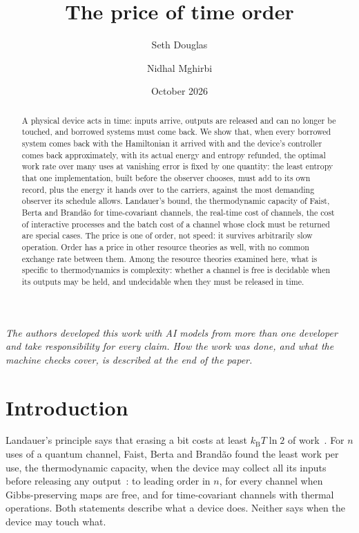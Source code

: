 \documentclass[11pt]{article}
\title{The price of time order}
\author{Seth Douglas \and Nidhal Mghirbi}
\date{October 2026}
\theoremstyle{definition}
\theoremstyle{remark}
\newcommand{\kB}{k_{\mathrm B}}
\begin{document}
\maketitle

\begin{abstract}
A physical device acts in time: inputs arrive, outputs are released and can no longer be touched, and borrowed systems must come back. We show that, when every borrowed system comes back with the Hamiltonian it arrived with and the device's controller comes back approximately, with its actual energy and entropy refunded, the optimal work rate over many uses at vanishing error is fixed by one quantity: the least entropy that one implementation, built before the observer chooses, must add to its own record, plus the energy it hands over to the carriers, against the most demanding observer its schedule allows. Landauer's bound, the thermodynamic capacity of Faist, Berta and Brand\~ao for time-covariant channels, the real-time cost of channels, the cost of interactive processes and the batch cost of a channel whose clock must be returned are special cases. The price is one of order, not speed: it survives arbitrarily slow operation. Order has a price in other resource theories as well, with no common exchange rate between them. Among the resource theories examined here, what is specific to thermodynamics is complexity: whether a channel is free is decidable when its outputs may be held, and undecidable when they must be released in time.
\end{abstract}

\noindent\emph{The authors developed this work with AI models from more than one developer and take responsibility for every claim. How the work was done, and what the machine checks cover, is described at the end of the paper.}

{\small\tableofcontents}

\section{Introduction}\label{sec:intro}

Landauer's principle says that erasing a bit costs at least $\kB T\ln2$ of work~\cite{Landauer61}. For $n$ uses of a quantum channel, Faist, Berta and Brand\~ao found the least work per use, the thermodynamic capacity, when the device may collect all its inputs before releasing any output~\cite{FBB19,FBB21}: to leading order in $n$, for every channel when Gibbs-preserving maps are free, and for time-covariant channels with thermal operations. Both statements describe what a device does. Neither says when the device may touch what.
\end{document}
